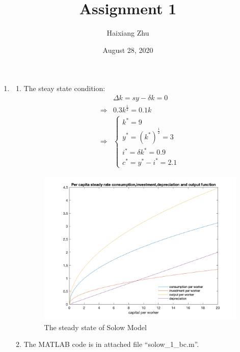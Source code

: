 \documentclass{article}
\title{Assignment 1}
\date{August 28, 2020}
\author{Haixiang Zhu}
\begin{document}
\maketitle
\begin{enumerate}
	\item 
    \begin{enumerate}
    	\item  The steay state condition:
    	\begin{align*}
		  &\Delta k = sy-\delta k = 0\\
		  \Rightarrow&0.3k^{\frac{1}{2}}=0.1k\\
		  \Rightarrow&
		  \begin{cases}
			k^\ast=9\\
			y^\ast=(k^\ast)^{\frac{1}{2}}=3\\
			i^\ast=\delta k^\ast=0.9\\
			c^\ast=y^\ast-i^\ast=2.1
		  \end{cases}
		\end{align*}
		\begin{figure}[h!]
			\centering
		  	\includegraphics[width=.99\linewidth]{1_1a.png}
		  	\caption{The steady state of Solow Model}
		\end{figure}
		\newpage
        \item The MATLAB code is in attached file ``solow\_1\_bc.m''.
        \begin{figure}[h!]

\end{figure}
\end{enumerate}
\end{enumerate}
\end{document}
